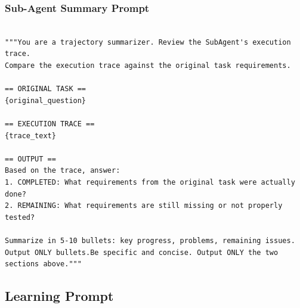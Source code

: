 \subsubsection{Sub-Agent Summary Prompt}
\label{app:B2_review}

\begin{tcolorbox}[title={\textbf{\small Sub-Agent Summary Prompt }},   boxrule=1pt, arc=0mm,colback=black!5!white,colframe=darkgray,breakable, before skip=10pt, after skip=10pt,pad at break=2mm, parbox=false]
\begin{verbatim}

"""You are a trajectory summarizer. Review the SubAgent's execution trace.
Compare the execution trace against the original task requirements.

== ORIGINAL TASK ==
{original_question}

== EXECUTION TRACE ==
{trace_text}

== OUTPUT ==
Based on the trace, answer:
1. COMPLETED: What requirements from the original task were actually done?
2. REMAINING: What requirements are still missing or not properly tested?

Summarize in 5-10 bullets: key progress, problems, remaining issues.
Output ONLY bullets.Be specific and concise. Output ONLY the two sections above."""

\end{verbatim}
\end{tcolorbox}


\subsection{Learning Prompt}

